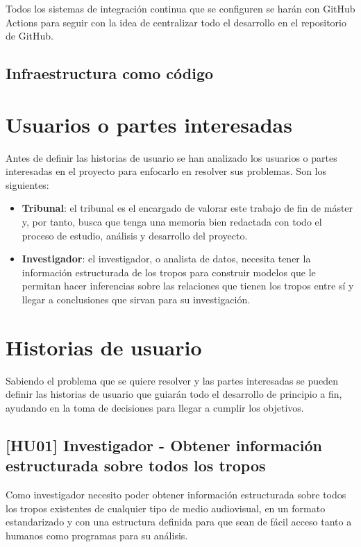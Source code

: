 Todos los sistemas de integración continua que se configuren se harán con GitHub
Actions para seguir con la idea de centralizar todo el desarrollo en el
repositorio de GitHub.

\subsection{Infraestructura como código}

\section{Usuarios o partes interesadas}
Antes de definir las historias de usuario se han analizado los usuarios o partes
interesadas en el proyecto para enfocarlo en resolver sus problemas. Son los
siguientes:
\begin{itemize}
    \item \textbf{Tribunal}: el tribunal es el encargado de valorar este trabajo
    de fin de máster y, por tanto, busca que tenga una memoria bien redactada
    con todo el proceso de estudio, análisis y desarrollo del proyecto.
    \item \textbf{Investigador}: el investigador, o analista de datos, necesita
    tener la información estructurada de los tropos para construir modelos que
    le permitan hacer inferencias sobre las relaciones que tienen los tropos
    entre sí y llegar a conclusiones que sirvan para su investigación.
\end{itemize}

\section{Historias de usuario}
Sabiendo el problema que se quiere resolver y las partes interesadas se pueden
definir las historias de usuario que guiarán todo el desarrollo de principio a
fin, ayudando en la toma de decisiones para llegar a cumplir los objetivos.

\subsection{[HU01] Investigador - Obtener información estructurada sobre todos los tropos}
Como investigador necesito poder obtener información estructurada sobre todos
los tropos existentes de cualquier tipo de medio audiovisual, en un formato
estandarizado y con una estructura definida para que sean de fácil acceso tanto
a humanos como programas para su análisis.


